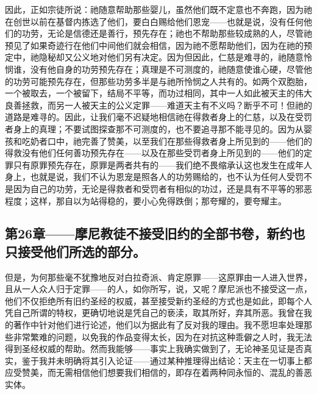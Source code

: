 因此，正如宗徒所说：祂随意帮助那些婴儿，虽然他们既不定意也不奔跑，因为祂在创世以前在基督内拣选了他们，要白白赐给他们恩宠——也就是说，没有任何他们的功劳，无论是信德还是善行，预先存在；祂也不帮助那些较成熟的人，尽管祂预见了如果奇迹行在他们中间他们就会相信，因为祂不愿帮助他们，因为在祂的预定中，祂隐秘却又公义地对他们另有决定。因为但因此，仁慈是难寻的，祂随意怜悯谁，没有他自身的功劳预先存在；真理是不可测度的，祂随意使谁心硬，尽管他的功劳可能预先存在，但那些功劳多半是与祂所怜悯之人共有的。如两个双胞胎，一个被取去，一个被留下，结局不平等，而功过相同，其中一人如此被天主的伟大良善拯救，而另一人被天主的公义定罪——难道天主有不义吗？断乎不可！但祂的道路是难寻的。因此，让我们毫不迟疑地相信祂在得救者身上的仁慈，以及在受罚者身上的真理；不要试图探查那不可测度的，也不要追寻那不能寻见的。因为从婴孩和吃奶者口中，祂完善了赞美，以至我们在那些得救者身上所见到的——他们的得救没有他们任何善功预先存在——以及在那些受罚者身上所见到的——他们的定罪只有原罪预先存在，原罪是两者共有的——我们绝不畏缩承认这也发生在成年人身上，也就是说，我们不认为恩宠是照各人的功劳赐给的，也不认为任何人受罚不是因为自己的功劳，无论是得救者和受罚者有相似的功过，还是具有不平等的邪恶程度；这样，那自以为站得稳的，要小心免得跌倒；那夸耀的，要夸耀主。\par


\subsection{第26章——摩尼教徒不接受旧约的全部书卷，新约也只接受他们所选的部分。}

但是，为何那些毫不犹豫地反对白拉奇派、肯定原罪——这原罪由一人进入世界，且从一人众人归于定罪——的人，如你所写，说，又呢？摩尼派也不接受这一点，他们不仅拒绝所有旧约圣经的权威，甚至接受新约圣经的方式也是如此，即每个人凭自己所谓的特权，更确切地说是凭自己的亵渎，取其所好，弃其所恶。我曾在我的著作中针对他们进行论述，他们以为据此有了反对我的理由。我不愿坦率处理那些非常繁难的问题，以免我的作品变得太长，因为在对抗这种乖僻之人时，我无法得到圣经权威的帮助。然而我能够——事实上我确实做到了，无论神圣见证是否真实，鉴于我并未明确将其引入论证——通过某种推理得出结论：天主在一切事上都应受赞美，而无需相信他们想要我们相信的，即存在着两种同永恒的、混乱的善恶实体。\par

